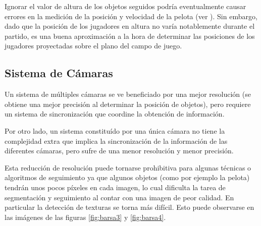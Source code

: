 Ignorar el valor de altura de los objetos seguidos podría eventualmente causar
errores en la medición de la posición y velocidad de la pelota (ver
\cite{Liu20061146}). Sin embargo, dado que la posición de los jugadores en
altura no varía notablemente durante el partido, es una buena aproximación a la
hora de determinar las posiciones de los jugadores proyectadas sobre el plano
del campo de juego.

\subsection{Sistema de Cámaras}
\label{sub-sec:camaras}

Un sistema de múltiples cámaras se ve beneficiado por una mejor resolución (se
obtiene una mejor precisión al determinar la posición de objetos), pero
requiere un sistema de sincronización que coordine la obtención de información.

Por otro lado, un sistema constituído por una única cámara no tiene la
complejidad extra que implica la sincronización de la información de las
diferentes cámaras, pero sufre de una menor resolución y menor precisión.

Esta reducción de resolución puede tornarse prohibitiva para algunas técnicas o
algoritmos de seguimiento ya que algunos objetos (como por ejemplo la pelota)
tendrán unos pocos píxeles en cada imagen, lo cual dificulta la tarea de
segmentación y seguimiento al contar con una imagen de peor calidad. En
particular la detección de texturas se torna más difícil. Esto puede observarse
en las imágenes de las figuras \ref{fig:barsa3} y \ref{fig:barsa4}.

